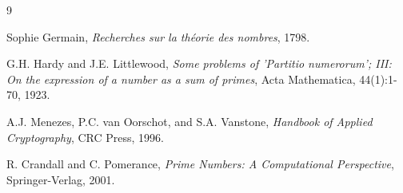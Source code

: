 \documentclass[11pt,a4paper]{article}
\theoremstyle{definition}
\theoremstyle{remark}
\begin{document}
\begin{thebibliography}{9}

Sophie Germain, \textit{Recherches sur la théorie des nombres}, 1798.

G.H. Hardy and J.E. Littlewood, \textit{Some problems of 'Partitio numerorum'; III: On the expression of a number as a sum of primes}, Acta Mathematica, 44(1):1-70, 1923.

A.J. Menezes, P.C. van Oorschot, and S.A. Vanstone, \textit{Handbook of Applied Cryptography}, CRC Press, 1996.

R. Crandall and C. Pomerance, \textit{Prime Numbers: A Computational Perspective}, Springer-Verlag, 2001.

\end{thebibliography}
\end{document}
